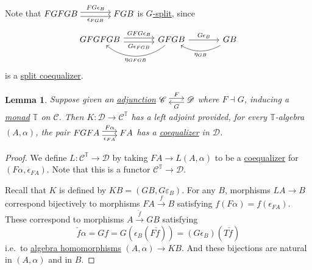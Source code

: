 \documentclass{article}
\newenvironment{tikzcdi}{\begin{tikzcd}[cramped, sep=scriptsize]}{\end{tikzcd}}
\newtheorem{nlemma}[nthm]{Lemma}
\begin{document}
Note that $\begin{tikzcd}[cramped, column sep=large]FGFGB \rar[shift left]{FG\epsilon_B} \rar[shift right,']{\epsilon_{FGB}} & FGB\end{tikzcd}$ is \hyperlink{def:gsplit}{$G$-split}, since
\begin{equation*}
  \begin{tikzcd}[column sep=large]
  GFGFGB \rar[shift left]{GFG\epsilon_B} \rar[shift right,']{G\epsilon_{FGB}} & GFGB \lar[bend left=40]{\eta_{GFGB}} \rar{G\epsilon_B} & GB \lar[bend left]{\eta_{GB}}
  \end{tikzcd}
\end{equation*}
is a \hyperlink{def:splitcoeq}{split coequalizer}.
\begin{nlemma}\label{lem:5.11}
  Suppose given an \hyperlink{def:adj}{adjunction}
  $ \begin{tikzcdi} \mathscr{C} \rar[shift left]{F} & \mathscr{D} \lar[shift left]{G} \end{tikzcdi} $
  where \(F \dashv G\), inducing a \hyperlink{def:monad}{monad} $\mathbb{T}$ on \(\mathscr{C}\).
  Then \hyperlink{def:emcomp}{$K: \mathscr{D} \to \mathscr{C}^\mathbb{T}$} has a left adjoint provided, for every $\mathbb{T}$-algebra \((A, \alpha)\), the pair
  $\begin{tikzcdi}
    FGFA \ar[r, shift left, "F\alpha"] \ar[r, shift right, "\epsilon_{FA}"'] & FA
  \end{tikzcdi}$
  has a \hyperlink{def:equalizer}{coequalizer} in $\mathscr{D}$.
\end{nlemma}
\begin{proof}
  We define $L: \mathscr{C}^\mathbb{T} \to \mathscr{D}$ by taking $FA \to L(A, \alpha)$ to be a \hyperlink{def:equalizer}{coequalizer} for $(F\alpha, \epsilon_{FA})$.
  Note that this is a functor $\mathscr{C}^\mathbb{T} \to \mathscr{D}$.

  Recall that \hyperlink{def:emcomp}{$K$} is defined by $KB = (GB, G\varepsilon_B)$.
  For any $B$, morphisms $LA \to B$ correspond bijectively to morphisms $FA \xrightarrow{f} B$ satisfying $f(F\alpha) = f(\epsilon_{FA})$.
  These correspond to morphisms $A \xrightarrow{\check f} GB$ satisfying
  \begin{equation*}
    \check f \alpha = Gf = G(\epsilon_B(F \check f)) = (G\epsilon_B)(T \check f)
  \end{equation*}
  i.e.\ to \hyperlink{def:em}{algebra homomorphisms} $(A, \alpha) \to KB$. And these bijections are natural in $(A, \alpha)$ and in $B$.
\end{proof}
\end{document}
